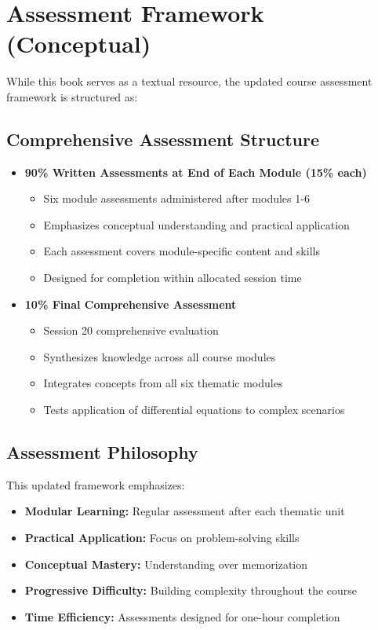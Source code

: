 \documentclass[12pt, letterpaper]{book}
\theoremstyle{problemstyle}
\theoremstyle{solutionstyle}
\begin{document}
\appendix
\chapter{Assessment Framework (Conceptual)}
\label{app:assessment}
While this book serves as a textual resource, the updated course assessment framework is structured as:

\section{Comprehensive Assessment Structure}
\begin{itemize}
    \item \textbf{90\% Written Assessments at End of Each Module (15\% each)}
    \begin{itemize}
        \item Six module assessments administered after modules 1-6
        \item Emphasizes conceptual understanding and practical application
        \item Each assessment covers module-specific content and skills
        \item Designed for completion within allocated session time
    \end{itemize}

    \item \textbf{10\% Final Comprehensive Assessment}
    \begin{itemize}
        \item Session 20 comprehensive evaluation
        \item Synthesizes knowledge across all course modules
        \item Integrates concepts from all six thematic modules
        \item Tests application of differential equations to complex scenarios
    \end{itemize}
\end{itemize}

\section{Assessment Philosophy}
This updated framework emphasizes:
\begin{itemize}
    \item \textbf{Modular Learning:} Regular assessment after each thematic unit
    \item \textbf{Practical Application:} Focus on problem-solving skills
    \item \textbf{Conceptual Mastery:} Understanding over memorization
    \item \textbf{Progressive Difficulty:} Building complexity throughout the course
    \item \textbf{Time Efficiency:} Assessments designed for one-hour completion
\end{itemize}
\end{document}
